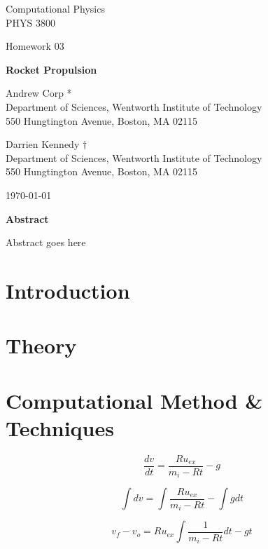 \documentclass{article}
\begin{document}
\begin{titlepage}

	\centering
	{\Large Computational Physics \\ PHYS 3800 \par}
	\vspace{0.25cm}
	{\Large Homework 03 \par}
	\vspace{2cm}
	
	{\huge \textbf{ Rocket Propulsion} \par}
	\vspace{1cm}
	
	{\large Andrew Corp * \\ Department of Sciences, Wentworth Institute of Technology \\ 550 Hungtington Avenue, Boston, MA 02115}
	
		{\large Darrien Kennedy $\dagger$ \\ Department of Sciences, Wentworth Institute of Technology \\ 550 Hungtington Avenue, Boston, MA 02115}

	{\large \today \par}
\end{titlepage}
\newpage

{\centering \textbf{Abstract} \par}

Abstract goes here

\section{Introduction}

\section{Theory}

\section{Computational Method \& Techniques}

\begin{equation}
\frac{dv}{dt} = \frac{Ru_{ex}}{m_i-Rt}-g
\end{equation}

\begin{equation}
\int{dv} = \int{\frac{Ru_{ex}}{m_i-Rt}} - \int{g dt}
\end{equation}

\begin{equation}
v_f-v_o = Ru_{ex}\int{\frac{1}{m_i-Rt}}dt - gt
\end{equation}
\end{document}

